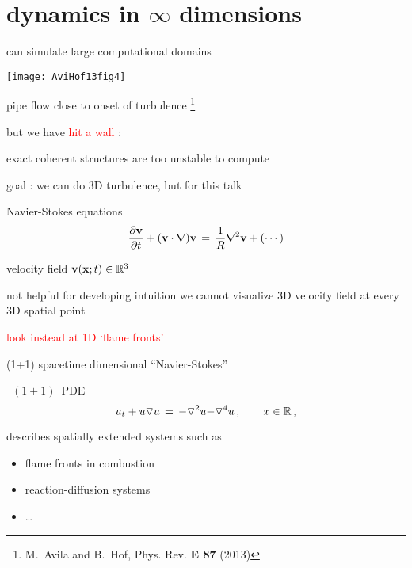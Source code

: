 \section[dynamics in $\infty$ dimensions]
{dynamics in $\infty$ dimensions}

\begin{frame}{can simulate {\Huge large} computational domains}
\begin{center}
\texttt{[image: AviHof13fig4]}
\end{center}
pipe flow close to onset of turbulence
\footnote{M.~Avila and B.~Hof, {Phys. Rev. \bf E 87} (2013)}

\bigskip

but we have \textcolor{red}{\Huge hit a wall} :

\hfill exact coherent structures are too unstable to compute
\end{frame}

\begin{frame}{goal : we can do 3D turbulence, but for this talk}
\begin{block}{Navier-Stokes equations} %
\[
\dfrac{\partial \bv}{\partial t} + (\bv \cdot \nabla) \bv
	\,=\,
\frac{1}{R} \nabla ^2 \bv + (\cdots)
\]
\end{block}

\hfill{\small velocity field  $\bv(\bx;t) \in \mathbb{R}^3$}

\medskip

\begin{block}{not helpful for developing intuition}
we cannot visualize 3D velocity field at every 3D spatial point
\end{block}

\bigskip

\hfill {\Large\textcolor{red}{look instead at 1D `flame fronts'}}
\end{frame}

\begin{frame}{(1+1) spacetime dimensional ``Navier-Stokes''}


\begin{block}{\KS\ $(1+1)$\dmn\ PDE}
\[
  u_t + u \triangledown u \,=\,
    {\color{red}-}\triangledown^2 u {\color{red}-\triangledown^4 u}
    \,,\qquad   x \in \mathbb{R}
    \,,
\]
\end{block}

\bigskip

describes spatially extended systems such as
\begin{itemize}
 \item flame fronts in combustion
 \item reaction-diffusion systems
 \item \ldots
\end{itemize}
\end{frame}

